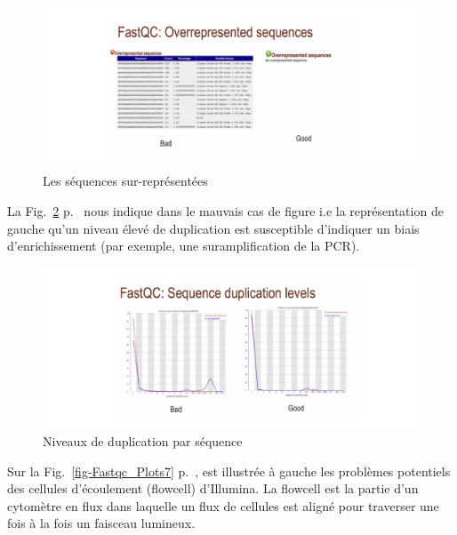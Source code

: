 \documentclass[a4paper,11pt]{article}
\begin{document}
\begin{figure}
  \begin{center}
    \includegraphics[width=16cm]{Images/Fastqc_Plots5}
  \end{center}
  \caption{Les séquences sur-représentées}
  \label{fig-Fastqc_Plots5}
\end{figure}

La Fig.~\ref{fig-Fastqc_Plots6} p.~\pageref{fig-Fastqc_Plots6} nous
indique dans le mauvais cas de figure i.e la représentation de gauche
qu'un niveau élevé de duplication est susceptible d'indiquer un biais
d'enrichissement (par exemple, une suramplification de la PCR).

\begin{figure}
  \begin{center}
    \includegraphics[width=16cm]{Images/Fastqc_Plots6}
  \end{center}
  \caption{Niveaux de duplication par séquence}
  \label{fig-Fastqc_Plots6}
\end{figure}

Sur la Fig.~\ref{fig-Fastqc_Plots7} p.~\pageref{fig-Fastqc_Plots7},
est illustrée à gauche les problèmes potentiels des cellules
d'écoulement (flowcell) d'Illumina. La flowcell est la partie d'un
cytomètre en flux dans laquelle un flux de cellules est aligné pour
traverser une fois à la fois un faisceau lumineux.
\end{document}
